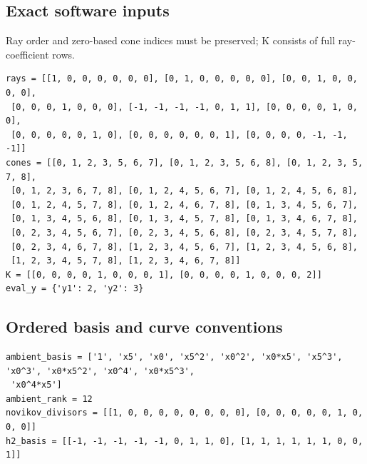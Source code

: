 \documentclass[10pt,a4paper]{article}
\begin{document}
\subsection*{Exact software inputs}
Ray order and zero-based cone indices must be preserved; K consists of full ray-coefficient rows.
\begin{lstlisting}
rays = [[1, 0, 0, 0, 0, 0, 0], [0, 1, 0, 0, 0, 0, 0], [0, 0, 1, 0, 0, 0, 0],
 [0, 0, 0, 1, 0, 0, 0], [-1, -1, -1, -1, 0, 1, 1], [0, 0, 0, 0, 1, 0, 0],
 [0, 0, 0, 0, 0, 1, 0], [0, 0, 0, 0, 0, 0, 1], [0, 0, 0, 0, -1, -1, -1]]
cones = [[0, 1, 2, 3, 5, 6, 7], [0, 1, 2, 3, 5, 6, 8], [0, 1, 2, 3, 5, 7, 8],
 [0, 1, 2, 3, 6, 7, 8], [0, 1, 2, 4, 5, 6, 7], [0, 1, 2, 4, 5, 6, 8],
 [0, 1, 2, 4, 5, 7, 8], [0, 1, 2, 4, 6, 7, 8], [0, 1, 3, 4, 5, 6, 7],
 [0, 1, 3, 4, 5, 6, 8], [0, 1, 3, 4, 5, 7, 8], [0, 1, 3, 4, 6, 7, 8],
 [0, 2, 3, 4, 5, 6, 7], [0, 2, 3, 4, 5, 6, 8], [0, 2, 3, 4, 5, 7, 8],
 [0, 2, 3, 4, 6, 7, 8], [1, 2, 3, 4, 5, 6, 7], [1, 2, 3, 4, 5, 6, 8],
 [1, 2, 3, 4, 5, 7, 8], [1, 2, 3, 4, 6, 7, 8]]
K = [[0, 0, 0, 0, 1, 0, 0, 0, 1], [0, 0, 0, 0, 1, 0, 0, 0, 2]]
eval_y = {'y1': 2, 'y2': 3}
\end{lstlisting}
\subsection*{Ordered basis and curve conventions}
\begin{lstlisting}
ambient_basis = ['1', 'x5', 'x0', 'x5^2', 'x0^2', 'x0*x5', 'x5^3', 'x0^3', 'x0*x5^2', 'x0^4', 'x0*x5^3',
 'x0^4*x5']
ambient_rank = 12
novikov_divisors = [[1, 0, 0, 0, 0, 0, 0, 0, 0], [0, 0, 0, 0, 0, 1, 0, 0, 0]]
h2_basis = [[-1, -1, -1, -1, -1, 0, 1, 1, 0], [1, 1, 1, 1, 1, 1, 0, 0, 1]]
\end{lstlisting}
\end{document}
